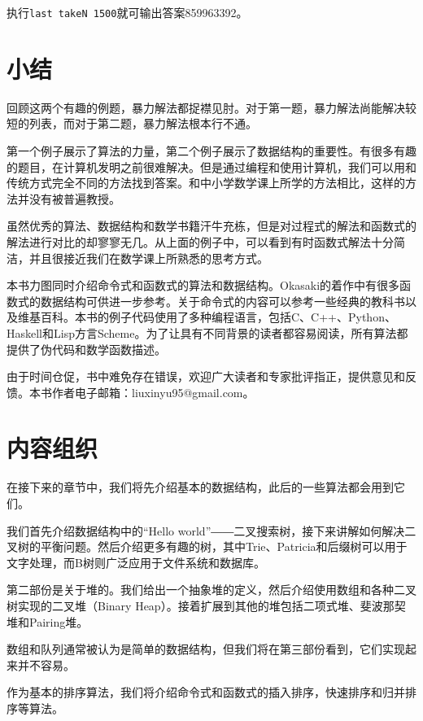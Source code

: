 \documentclass[UTF8]{article}
\begin{document}
执行\texttt{last takeN 1500}就可输出答案859963392。

\section{小结}
回顾这两个有趣的例题，暴力解法都捉襟见肘。对于第一题，暴力解法尚能解决较短的列表，而对于第二题，暴力解法根本行不通。

第一个例子展示了算法的力量，第二个例子展示了数据结构的重要性。有很多有趣的题目，在计算机发明之前很难解决。但是通过编程和使用计算机，我们可以用和传统方式完全不同的方法找到答案。和中小学数学课上所学的方法相比，这样的方法并没有被普遍教授。

虽然优秀的算法、数据结构和数学书籍汗牛充栋，但是对过程式的解法和函数式的解法进行对比的却寥寥无几。从上面的例子中，可以看到有时函数式解法十分简洁，并且很接近我们在数学课上所熟悉的思考方式。

本书力图同时介绍命令式和函数式的算法和数据结构。Okasaki的着作\cite{okasaki-book}中有很多函数式的数据结构可供进一步参考。关于命令式的内容可以参考一些经典的教科书\cite{CLRS}以及维基百科。本书的例子代码使用了多种编程语言，包括C、C++、Python、Haskell和Lisp方言Scheme。为了让具有不同背景的读者都容易阅读，所有算法都提供了伪代码和数学函数描述。

由于时间仓促，书中难免存在错误，欢迎广大读者和专家批评指正，提供意见和反馈。本书作者电子邮箱：liuxinyu95@gmail.com。

\section{内容组织}
在接下来的章节中，我们将先介绍基本的数据结构，此后的一些算法都会用到它们。

我们首先介绍数据结构中的“Hello world”――二叉搜索树，接下来讲解如何解决二叉树的平衡问题。然后介绍更多有趣的树，其中Trie、Patricia和后缀树可以用于文字处理，而B树则广泛应用于文件系统和数据库。

第二部份是关于堆的。我们给出一个抽象堆的定义，然后介绍使用数组和各种二叉树实现的二叉堆（Binary Heap）。接着扩展到其他的堆包括二项式堆、斐波那契堆和Pairing堆。

数组和队列通常被认为是简单的数据结构，但我们将在第三部份看到，它们实现起来并不容易。

作为基本的排序算法，我们将介绍命令式和函数式的插入排序，快速排序和归并排序等算法。
\end{document}
